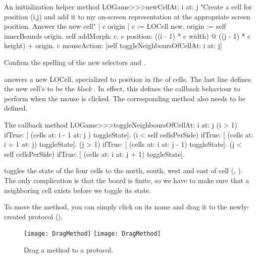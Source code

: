 \documentclass[a4paper,10pt,twoside]{book}
\begin{document}
{
\begin{method}[newCellAt:at:]{An initialization helper method}
LOGame>>>newCellAt: i at: j
   "Create a cell for position (i,j) and add it to my on-screen
   representation at the appropriate screen position.  Answer the new cell"
   | c origin |
   c := LOCell new.
   origin := self innerBounds origin.
   self addMorph: c.
   c position: ((i - 1) * c width) @ ((j - 1) * c height) + origin.
   c mouseAction: [self toggleNeighboursOfCellAt: i at: j]
\end{method}

Confirm the spelling of the new selectors  and .

 answers a new LOCell, specialized to position  in the  of cells.
The last line defines the new cell's  to be the \emph{block}
\mbox{.}
 In effect, this defines the callback behaviour to perform when the mouse is clicked.
The corresponding method also needs to be defined.

\begin{method}[toggleNeighboursOfCellAt:at:]{The callback method}
LOGame>>>toggleNeighboursOfCellAt: i at: j
   (i > 1) ifTrue: [ (cells at: i - 1 at: j ) toggleState].
   (i < self cellsPerSide) ifTrue: [ (cells at: i + 1 at: j) toggleState].
   (j > 1) ifTrue: [ (cells at: i  at: j - 1) toggleState].
   (j < self cellsPerSide) ifTrue: [ (cells at: i at: j + 1) toggleState].
\end{method}

 toggles the state of the four cells to the north, south, west and east of cell (, ).  The only complication is that the board is finite, so we have to make sure that a neighboring cell exists before we toggle its state.

To move the method, you can simply click on its name and drag it to the newly-created protocol ().

\begin{figure}[htbp]
   \centering
   \ifluluelse
		{\texttt{[image: DragMethod]} }
		{\texttt{[image: DragMethod]} }
   \caption{Drag a method to a protocol.}
\end{figure}

}
\end{document}
